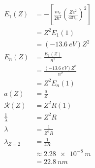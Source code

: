 \documentclass{article}
\begin{document}
\subsection{}

\begin{align*}
  E_1(Z)            & = -\left[ \frac{m_e}{2 \hbar^2} \left( \frac{Z e^2}{4 \pi \epsilon_0} \right)^2 \right] \\
                    & = Z^2 E_1(1)                                                                            \\
                    & = (\qty{-13.6}{eV}) Z^2                                                                 \\
  E_n(Z)            & = \frac{E_1(Z)}{n^2}                                                                    \\
                    & = \frac{(\qty{-13.6}{eV}) Z^2}{n^2}                                                     \\
                    & = Z^2 E_n(1)                                                                            \\
  a(Z)              & = \frac{a}{Z}                                                                           \\
  \mathcal{R}(Z)    & = Z^2 R(1)                                                                              \\
  \frac{1}{\lambda} & = Z^2 R                                                                                 \\
  \lambda           & = \frac{1}{Z^2 R}                                                                       \\
  \lambda_{Z = 2}   & = \frac{1}{4 R}                                                                         \\
                    & \approx \qty{2.28e-8}{m}                                                                \\
                    & = \qty{22.8}{nm}
\end{align*}

\subsection{}
\end{document}
